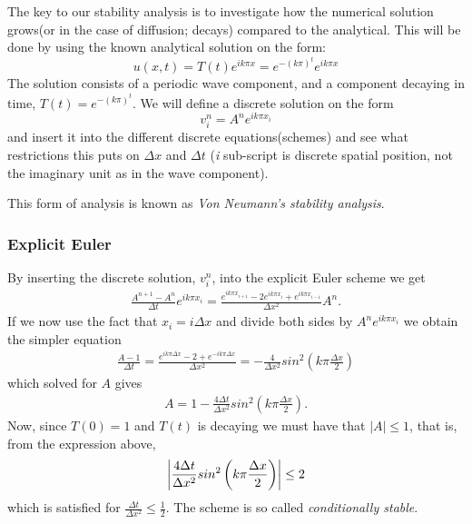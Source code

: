 \documentclass[11pt,a4paper,draft]{article}
\numberwithin{equation}{section}
\begin{document}
The key to our stability analysis is to investigate how the numerical solution grows(or in the case of diffusion; decays) compared to the analytical. This will be done by using the known analytical solution on the form:
\begin{equation}
u(x,t) = T(t)e^{ik \pi x} = e^{-(k\pi)^t}e^{ik \pi x}
\end{equation}
The solution consists of a periodic wave component, and a component decaying in time, $T(t)=e^{-(k\pi)^t}$. We will define a discrete solution on the form
\begin{equation}
v^n_i = A^n e^{ik \pi x_i}
\end{equation}
and insert it into the different discrete equations(schemes) and see what restrictions this puts on $\Delta x$ and $\Delta t$ (\emph{i} sub-script is discrete spatial position, not the imaginary unit as in the wave component).

This form of analysis is known as \emph{Von Neumann's stability analysis}.

\subsubsection{Explicit Euler}

By inserting the discrete solution, $v^n_i$, into the explicit Euler scheme we get
\begin{align*}
\frac{A^{n+1}-A^{n}}{\Delta t} e^{ik \pi x_i} = \frac{e^{ik \pi x_{i+1}} -2e^{ik \pi x_i} + e^{ik \pi x_{i-1}}}{\Delta x^2} A^n.
\end{align*}
If we now use the fact that $x_i = i\Delta x$ and divide both sides by $A^n e^{ik \pi x_i}$ we obtain the simpler equation
\begin{align*}
\frac{A-1}{\Delta t} = \frac{e^{ik \pi \Delta x} -2 + e^{-ik \pi \Delta x}}{\Delta x^2} = -\frac{4}{\Delta x^2}sin^2\left(k\pi \frac{\Delta x}{2}\right)
\end{align*}
which solved for $A$ gives
\begin{align*}
A=1-\frac{4\Delta t}{\Delta x^2}sin^2\left(k\pi \frac{\Delta x}{2}\right).
\end{align*}
Now, since $T(0)=1$ and $T(t)$ is decaying we must have that $|A| \leq 1$, that is, from the expression above, 
\begin{align*}
\abs{ \frac{4\Delta t}{\Delta x^2}sin^2\left(k\pi \frac{\Delta x}{2}\right)} \leq 2
\end{align*} 
which is satisfied for $\frac{\Delta t}{\Delta x^2} \leq \frac{1}{2}$. The scheme is so called \emph{conditionally stable}.
\end{document}
